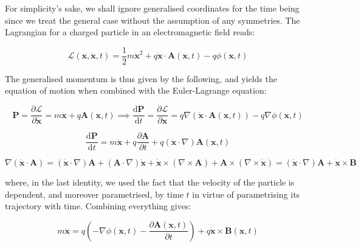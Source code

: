 \vspace*{2.5pt}

\quad For simplicity's sake, we shall ignore generalised coordinates for the time being since we treat the general case without the assumption of any symmetries. The Lagrangian for a charged particle in an electromagnetic field reads:

\begin{equation}
    \mathcal{L}(\mathbf{x},\dot{\mathbf{x}},t)=\frac{1}{2}m\dot{\mathbf{x}}^2+q\dot{\mathbf{x}}\cdot \mathbf{A}\left(\mathbf{x},t\right)-q\phi \left(\mathbf{x},t\right)
\end{equation}

The generalised momentum is thus given by the following, and yields the equation of motion when combined with the Euler-Lagrange equation:

\begin{equation*}
    \mathbf{P}=\frac{\partial\mathcal{L}}{\partial \dot{\mathbf{x}}}=m\dot{\mathbf{x}}+q \mathbf{A}\left(\mathbf{x},t\right)\implies \frac{\mathrm{d}\mathbf{P}}{\mathrm{d}t}=\frac{\partial \mathcal{L}}{\partial \mathbf{x}}=q\nabla\left(\dot{\mathbf{x}}\cdot \mathbf{A}(\mathbf{x},t)\right)-q\nabla\phi \left(\mathbf{x},t\right)
\end{equation*}

\begin{equation*}
    \frac{\mathrm{d}\mathbf{P}}{\mathrm{d}t}=m\ddot{\mathbf{x}}+q \frac{\partial \mathbf{A}}{\partial t}+q\left(\dot{\mathbf{x}}\cdot\nabla\right)\mathbf{A}(\mathbf{x},t)
\end{equation*}

\begin{equation*}
    \nabla \left(\dot{\mathbf{x}}\cdot \mathbf{A}\right)=\left(\dot{\mathbf{x}}\cdot\nabla\right)\mathbf{A}+\left(\mathbf{A}\cdot\nabla\right)\dot{\mathbf{x}}+\dot{\mathbf{x}}\times \left(\nabla\times \mathbf{A}\right)+\mathbf{A}\times \left(\nabla\times \dot{\mathbf{x}}\right)=\left(\dot{\mathbf{x}}\cdot\nabla\right)\mathbf{A}+\dot{\mathbf{x}}\times \mathbf{B}
\end{equation*}

where, in the last identity, we used the fact that the velocity of the particle is dependent, and moreover parametrised, by time $t$ in virtue of parametrising its trajectory with time. Combining everything gives:

\begin{equation}
    m\ddot{\mathbf{x}}=q \left(-\nabla\phi(\mathbf{x},t)-\frac{\partial \mathbf{A}(\mathbf{x},t)}{\partial t}\right)+q\dot{\mathbf{x}}\times \mathbf{B}(\mathbf{x},t)
\end{equation}

